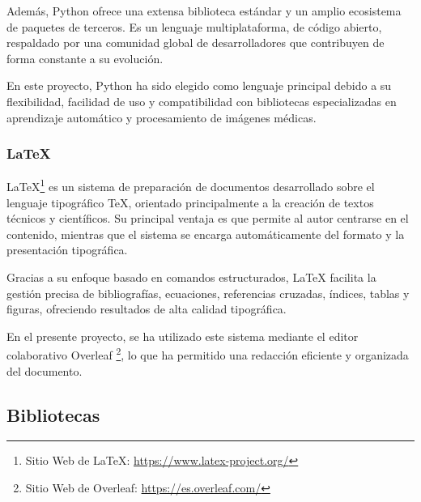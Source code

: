 Además, Python ofrece una extensa biblioteca estándar y un amplio ecosistema de paquetes de terceros. Es un lenguaje multiplataforma, de código abierto, respaldado por una comunidad global de desarrolladores que contribuyen de forma constante a su evolución.

En este proyecto, Python ha sido elegido como lenguaje principal debido a su flexibilidad, facilidad de uso y compatibilidad con bibliotecas especializadas en aprendizaje automático y procesamiento de imágenes médicas.
\subsubsection{LaTeX}
LaTeX\footnote{Sitio Web de LaTeX: \url{https://www.latex-project.org/}} es un sistema de preparación de documentos desarrollado sobre el lenguaje tipográfico TeX, orientado principalmente a la creación de textos técnicos y científicos. Su principal ventaja es que permite al autor centrarse en el contenido, mientras que el sistema se encarga automáticamente del formato y la presentación tipográfica.

Gracias a su enfoque basado en comandos estructurados, LaTeX facilita la gestión precisa de bibliografías, ecuaciones, referencias cruzadas, índices, tablas y figuras, ofreciendo resultados de alta calidad tipográfica. 

En el presente proyecto, se ha utilizado este sistema mediante el editor colaborativo Overleaf \footnote{Sitio Web de Overleaf: \url{https://es.overleaf.com/}}, lo que ha permitido una redacción eficiente y organizada del documento.
\subsection{Bibliotecas}

